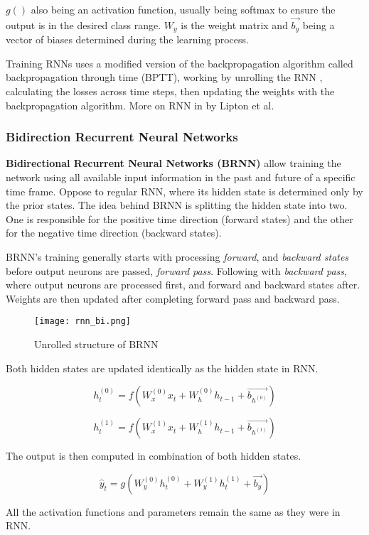 $g()$ also being an activation function, usually being softmax to ensure the output is in the desired class range. $W_y$ is the weight matrix and $\vec{b_y}$ being a vector of biases determined during the learning process.

Training RNNs uses a modified version of the backpropagation algorithm called backpropagation through time (BPTT), working by unrolling the RNN \cite{Goodfellow-et-al-2016}, calculating the losses across time steps, then updating the weights with the backpropagation algorithm. More on RNN in \cite{lipton2015critical} by Lipton et al.


\subsubsection{Bidirection Recurrent Neural Networks}


\textbf{Bidirectional Recurrent Neural Networks (BRNN)} allow training the network using all available input information in the past and future of a specific time frame. Oppose to regular RNN, where its hidden state is determined only by the prior states. The idea behind BRNN is splitting the hidden state into two. One is responsible for the positive time direction (forward states) and the other for the negative time direction (backward states).

BRNN’s training generally starts with processing \textit{forward}, and \textit{backward states} before output neurons are passed, \textit{forward pass}. Following with \textit{backward pass}, where output neurons are processed first, and forward and backward states after. Weights are then updated after completing forward pass and backward pass.\cite{schusterbdrnn}

\begin{figure}[h]
	\centering
    \texttt{[image: rnn\_bi.png]}
	\caption{Unrolled structure of BRNN \cite{matous}}
	\label{fig:brnn}
\end{figure}


Both hidden states are updated identically as the hidden state in RNN.

\begin{equation}
    {h_t^{(0)} = f(W_{x}^{(0)}x_t + W_{h}^{(0)}h_{t-1}+\vec{b_{h^{(0)}}})}
\end{equation}

\begin{equation}
    {h_t^{(1)} = f(W_{x}^{(1)}x_t + W_{h}^{(1)}h_{t-1}+\vec{b_{h^{(1)}}})}
\end{equation}

The output is then computed in combination of both hidden states.

\begin{equation}
    {\hat{y}_t = g(W_{y}^{(0)}h_t^{(0)} + W_{y}^{(1)}h_t^{(1)} + \vec{b_y})}
\end{equation}

All the activation functions and parameters remain the same as they were in RNN. 
